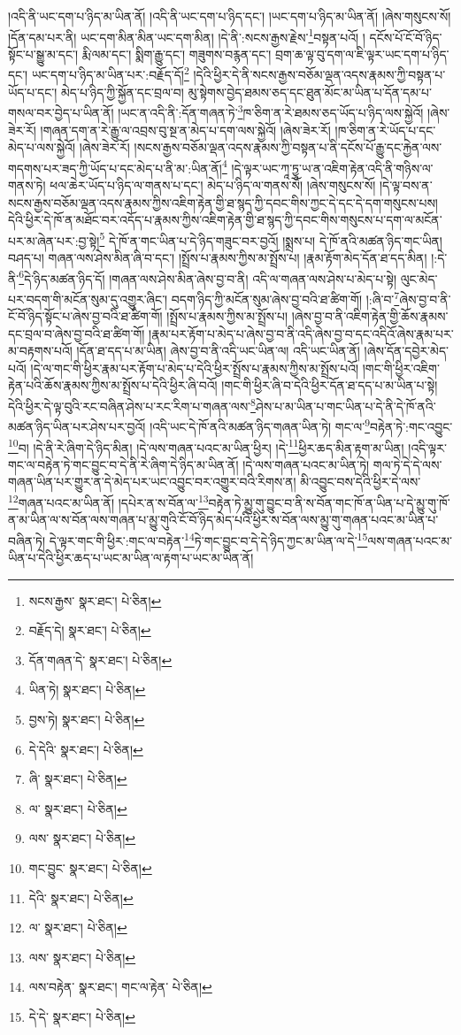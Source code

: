 །འདི་ནི་ཡང་དག་པ་ཉིད་མ་ཡིན་ནོ། །འདི་ནི་ཡང་དག་པ་ཉིད་དང་། །ཡང་དག་པ་ཉིད་མ་ཡིན་ནོ། །ཞེས་གསུངས་སོ། །དོན་དམ་པར་ནི། ཡང་དག་མིན་མིན་ཡང་དག་མིན། །དེ་ནི་:སངས་རྒྱས་རྗེས་\footnote{སངས་རྒྱས་  སྣར་ཐང་།  པེ་ཅིན། }བསྟན་པའོ། །
དངོས་པོ་ངོ་བོ་ཉིད་སྟོང་པ་སྒྱུ་མ་དང་། རྨི་ལམ་དང་། སྨིག་རྒྱུ་དང་། གཟུགས་བརྙན་དང་། བྲག་ཆ་ལྟ་བུ་དག་ལ་ཇི་ལྟར་ཡང་དག་པ་ཉིད་དང་། ཡང་དག་པ་ཉིད་མ་ཡིན་པར་:བརྗོད་དོ།\footnote{བརྗོད་དེ།  སྣར་ཐང་།  པེ་ཅིན། } །དེའི་ཕྱིར་དེ་ནི་སངས་རྒྱས་བཅོམ་ལྡན་འདས་རྣམས་ཀྱི་བསྟན་པ་ཡོད་པ་དང་། མེད་པ་ཉིད་ཀྱི་སྐྱོན་དང་བྲལ་བ། མུ་སྟེགས་བྱེད་ཐམས་ཅད་དང་ཐུན་མོང་མ་ཡིན་པ་དོན་དམ་པ་གསལ་བར་བྱེད་པ་ཡིན་ནོ། །ཡང་ན་འདི་ནི་:དོན་གཞན་ཏེ་\footnote{དོན་གཞན་དེ་  སྣར་ཐང་།  པེ་ཅིན། }ཁ་ཅིག་ན་རེ་ཐམས་ཅད་ཡོད་པ་ཉིད་ལས་སྐྱེའོ། །ཞེས་ཟེར་རོ། །གཞན་དག་ན་རེ་རྒྱུ་ལ་འབྲས་བུ་སྔ་ན་མེད་པ་དག་ལས་སྐྱེའོ། །ཞེས་ཟེར་རོ། །ཁ་ཅིག་ན་རེ་ཡོད་པ་དང་མེད་པ་ལས་སྐྱེའོ། །ཞེས་ཟེར་རོ། །སངས་རྒྱས་བཅོམ་ལྡན་འདས་རྣམས་ཀྱི་བསྟན་པ་ནི་དངོས་པོ་རྒྱུ་དང་རྐྱེན་ལས་གདགས་པར་ཟད་ཀྱི་ཡོད་པ་དང་མེད་པ་ནི་མ་:ཡིན་ནོ།\footnote{ཡིན་ཏེ།  སྣར་ཐང་།  པེ་ཅིན། } །དེ་ལྟར་ཡང་ཀཱ་ཏྱཱ་ཡ་ན་འཇིག་རྟེན་འདི་ནི་གཉིས་ལ་གནས་ཏེ། ཕལ་ཆེར་ཡོད་པ་ཉིད་ལ་གནས་པ་དང་། མེད་པ་ཉིད་ལ་གནས་སོ། །ཞེས་གསུངས་སོ། །དེ་ལྟ་བས་ན་སངས་རྒྱས་བཅོམ་ལྡན་འདས་རྣམས་ཀྱིས་འཇིག་རྟེན་གྱི་ཐ་སྙད་ཀྱི་དབང་གིས་ཀྱང་དེ་དང་དེ་དག་གསུངས་པས། དེའི་ཕྱིར་དེ་ཁོ་ན་མཐོང་བར་འདོད་པ་རྣམས་ཀྱིས་འཇིག་རྟེན་གྱི་ཐ་སྙད་ཀྱི་དབང་གིས་གསུངས་པ་དག་ལ་མངོན་པར་མ་ཞེན་པར་:བྱ་སྟེ།\footnote{བྱས་ཏེ།  སྣར་ཐང་།  པེ་ཅིན། } དེ་ཁོ་ན་གང་ཡིན་པ་དེ་ཉིད་གཟུང་བར་བྱའོ། །སྨྲས་པ། དེ་ཁོ་ནའི་མཚན་ཉིད་གང་ཡིན། བཤད་པ། གཞན་ལས་ཤེས་མིན་ཞི་བ་དང་། །སྤྲོས་པ་རྣམས་ཀྱིས་མ་སྤྲོས་པ། །རྣམ་རྟོག་མེད་དོན་ཐ་དད་མིན། །:དེ་ནི་\footnote{དེ་དེའི་  སྣར་ཐང་།  པེ་ཅིན། }དེ་ཉིད་མཚན་ཉིད་དོ། །གཞན་ལས་ཤེས་མིན་ཞེས་བྱ་བ་ནི། འདི་ལ་གཞན་ལས་ཤེས་པ་མེད་པ་སྟེ། ལུང་མེད་པར་བདག་གི་མངོན་སུམ་དུ་འགྱུར་ཞིང་། བདག་ཉིད་ཀྱི་མངོན་སུམ་ཞེས་བྱ་བའི་ཐ་ཚིག་གོ། །:ཞི་བ་\footnote{ཞི་  སྣར་ཐང་།  པེ་ཅིན། }ཞེས་བྱ་བ་ནི་ངོ་བོ་ཉིད་སྟོང་པ་ཞེས་བྱ་བའི་ཐ་ཚིག་གོ། །སྤྲོས་པ་རྣམས་ཀྱིས་མ་སྤྲོས་པ། །ཞེས་བྱ་བ་ནི་འཇིག་རྟེན་གྱི་ཆོས་རྣམས་དང་བྲལ་བ་ཞེས་བྱ་བའི་ཐ་ཚིག་གོ། །རྣམ་པར་རྟོག་པ་མེད་པ་ཞེས་བྱ་བ་ནི་འདི་ཞེས་བྱ་བ་དང་འདིའོ་ཞེས་རྣམ་པར་མ་བརྟགས་པའོ། །དོན་ཐ་དད་པ་མ་ཡིན། ཞེས་བྱ་བ་ནི་འདི་ཡང་ཡིན་ལ། འདི་ཡང་ཡིན་ནོ། །ཞེས་དོན་དབྱེར་མེད་པའོ། །དེ་ལ་གང་གི་ཕྱིར་རྣམ་པར་རྟོག་པ་མེད་པ་དེའི་ཕྱིར་སྤྲོས་པ་རྣམས་ཀྱིས་མ་སྤྲོས་པའོ། །གང་གི་ཕྱིར་འཇིག་རྟེན་པའི་ཆོས་རྣམས་ཀྱིས་མ་སྤྲོས་པ་དེའི་ཕྱིར་ཞི་བའོ། །གང་གི་ཕྱིར་ཞི་བ་དེའི་ཕྱིར་དོན་ཐ་དད་པ་མ་ཡིན་པ་སྟེ། དེའི་ཕྱིར་དེ་ལྟ་བུའི་རང་བཞིན་ཤེས་པ་རང་རིག་པ་གཞན་ལས་\footnote{ལ་  སྣར་ཐང་།  པེ་ཅིན། }ཤེས་པ་མ་ཡིན་པ་གང་ཡིན་པ་དེ་ནི་དེ་ཁོ་ནའི་མཚན་ཉིད་ཡིན་པར་ཤེས་པར་བྱའོ། །འདི་ཡང་དེ་ཁོ་ནའི་མཚན་ཉིད་གཞན་ཡིན་ཏེ། གང་ལ་\footnote{ལས་  སྣར་ཐང་།  པེ་ཅིན། }བརྟེན་ཏེ་:གང་འབྱུང་\footnote{གང་བྱུང་  སྣར་ཐང་།  པེ་ཅིན། }བ། །དེ་ནི་རེ་ཞིག་དེ་ཉིད་མིན། །དེ་ལས་གཞན་པའང་མ་ཡིན་ཕྱིར། །དེ་\footnote{དེའི་  སྣར་ཐང་།  པེ་ཅིན། }ཕྱིར་ཆད་མིན་རྟག་མ་ཡིན། །འདི་ལྟར་གང་ལ་བརྟེན་ཏེ་གང་བྱུང་བ་དེ་ནི་རེ་ཞིག་དེ་ཉིད་མ་ཡིན་ནོ། །དེ་ལས་གཞན་པའང་མ་ཡིན་ཏེ། གལ་ཏེ་དེ་དེ་ལས་གཞན་ཡིན་པར་གྱུར་ན་དེ་མེད་པར་ཡང་འབྱུང་བར་འགྱུར་བའི་རིགས་ན། མི་འབྱུང་བས་དེའི་ཕྱིར་དེ་ལས་\footnote{ལ་  སྣར་ཐང་།  པེ་ཅིན། }གཞན་པའང་མ་ཡིན་ནོ། །དཔེར་ན་ས་བོན་ལ་\footnote{ལས་  སྣར་ཐང་།  པེ་ཅིན། }བརྟེན་ཏེ་མྱུ་གུ་བྱུང་བ་ནི་ས་བོན་གང་ཁོ་ན་ཡིན་པ་དེ་མྱུ་གུ་ཁོ་ན་མ་ཡིན་ལ་ས་བོན་ལས་གཞན་པ་མྱུ་གུའི་ངོ་བོ་ཉིད་མེད་པའི་ཕྱིར་ས་བོན་ལས་མྱུ་གུ་གཞན་པའང་མ་ཡིན་པ་བཞིན་ཏེ། དེ་ལྟར་གང་གི་ཕྱིར་:གང་ལ་བརྟེན་\footnote{ལས་བརྟེན་  སྣར་ཐང་། གང་ལ་རྟེན་  པེ་ཅིན། }ཏེ་གང་བྱུང་བ་དེ་དེ་ཉིད་ཀྱང་མ་ཡིན་ལ་དེ་\footnote{དེ་དེ་  སྣར་ཐང་།  པེ་ཅིན། }ལས་གཞན་པའང་མ་ཡིན་པ་དེའི་ཕྱིར་ཆད་པ་ཡང་མ་ཡིན་ལ་རྟག་པ་ཡང་མ་ཡིན་ནོ། 